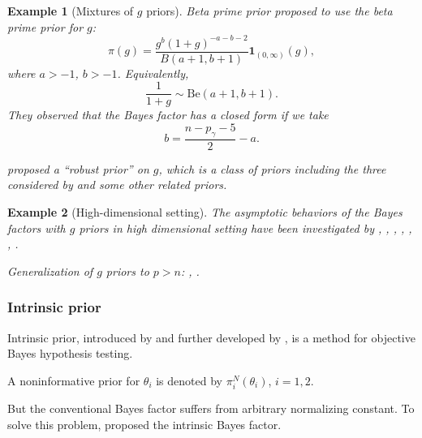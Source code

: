 \documentclass[11pt]{article}
\theoremstyle{plain}
\newtheorem{example}{Example}
\theoremstyle{definition}
\theoremstyle{remark}
\begin{document}
\begin{example}[Mixtures of $g$ priors]
\emph{Beta prime prior}
\cite{maruyama2011} proposed to use the beta prime prior for $g$:
\begin{equation*}
    \pi(g)=\frac{g^b (1+g)^{-a-b-2}}{B(a+1,b+1)}\mathbf{1}_{(0,\infty)}(g),
\end{equation*}
where $a>-1$, $b>-1$.
Equivalently,
\begin{equation*}
    \frac{1}{1+g}\sim \text{Be} (a+1,b+1).
\end{equation*}
They observed that the Bayes factor has a closed form if we take
\begin{equation*}
    b=\frac{n-p_\gamma-5}{2}-a.
\end{equation*}


\cite{bayarri2012} proposed a ``robust prior'' on $g$, which is a class of priors including the three considered by \cite{Liang2008Mixtures} and some other related priors.

\end{example}

\begin{example}[High-dimensional setting]
The asymptotic behaviors of the Bayes factors with $g$ priors in high dimensional setting have been investigated by \cite{Mukhopadhyay2014}, \cite{wang2017posterior}, \cite{Wang2016}, \cite{WANG201495}, \cite{wang2017}, \cite{XIANG201664},
\cite{Mukhopadhyay2016}.

Generalization of $g$ priors to $p>n$: \cite{maruyama2011}, \cite{Shang2011}.
    
\end{example}


\subsubsection{Intrinsic prior}
Intrinsic prior, introduced by \cite{intrisicBayesFactor} and further developed by \cite{Moreno1998An}, is a method for objective Bayes hypothesis testing.

A noninformative prior for $\theta_i$ is denoted by $\pi_i^N(\theta_i)$, $i=1,2$.

But the conventional Bayes factor suffers from arbitrary normalizing constant.
To solve this problem, \cite{intrisicBayesFactor} proposed the intrinsic Bayes factor.
\end{document}
